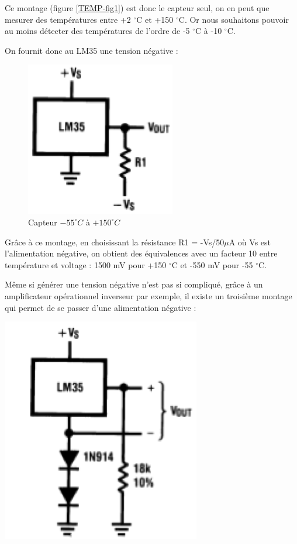 \documentclass[a4paper]{report}
\begin{document}
Ce montage (figure \ref{TEMP-fig1}) est donc le capteur seul, on en peut  que mesurer des températures entre +2 $^\circ$C et +150 $^\circ$C. Or nous souhaitons pouvoir au moins détecter des températures de l'ordre de -5 $^\circ$C  à -10 $^\circ$C.

On fournit donc au LM35 une tension négative :

\begin{figure}[h!]
	\centering
	\includegraphics[scale=0.6]{images/TEMP_fig2.png}
	\caption{Capteur $-55^\circ C$ à $+150^\circ C$}
\end{figure}

Grâce à ce montage, en choisissant la résistance R1 = -Vs/50$\mu$A où Vs est l'alimentation négative, on obtient des équivalences  avec un facteur 10 entre température et voltage : 1500 mV pour +150 $^\circ$C et -550 mV pour -55 $^\circ$C.

Même si générer une tension négative n'est pas si compliqué, grâce à un amplificateur opérationnel inverseur par exemple, il existe un troisième montage qui permet de se passer d'une alimentation négative :

\begin{center}
	\includegraphics[scale=0.6]{images/TEMP_fig3.png}
\end{center}
\end{document}
